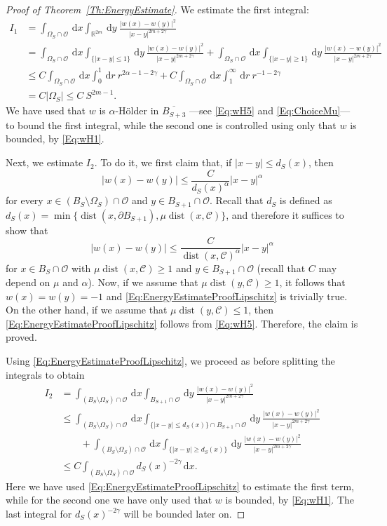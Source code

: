 \documentclass[12pt,reqno]{amsart}
\theoremstyle{definition}
\theoremstyle{remark}
\newcommand{\con}[1]{\mathbb{#1}}
\newcommand{\R}{\con{R}} %
\newcommand{\ccal}{\mathscr{C}}
\newcommand{\ocal}{\mathcal{O}}
\newcommand{\s}{\gamma}
\renewcommand{\d}{\,\mathrm{d}} %
\DeclareMathOperator{\dist}{dist}
\numberwithin{equation}{section}
\begin{document}
\begin{proof}[Proof of Theorem~\ref{Th:EnergyEstimate}]
	We estimate the first integral:
	\begin{align*}
	I_1 &= \int_{\Omega_{S}\cap \ocal} \d x \int_{\R^{2m}} \d y \  \frac{|w(x)-w(y)|^2}{|x-y|^{2m+2\s}} \\
	&= \int_{\Omega_{S}\cap \ocal} \d x \int_{\{|x-y|\leq 1\}} \d y \ \frac{|w(x)-w(y)|^2}{|x-y|^{2m+2\s}} + \int_{\Omega_{S}\cap \ocal} \d x \int_{\{|x-y|\geq 1\}} \d y \ \frac{|w(x)-w(y)|^2}{|x-y|^{2m+2\s}} \\
	&\leq C \int_{\Omega_{S}\cap \ocal} \d x \int_0^1 \d r \ r^{2\alpha-1-2\s} + C \int_{\Omega_{S}\cap \ocal} \d x \int_1^\infty \d r \ r^{-1-2\s} \\
	&= C |\Omega_S| \leq C \ S^{2m-1}.
	\end{align*}
	We have used that $w$ is $\alpha$-Hölder in $\overline{B_{S+3}}$ ---see \eqref{Eq:wH5} and \eqref{Eq:ChoiceMu}--- to bound the first integral, while the second one is controlled using only that $w$ is bounded, by \eqref{Eq:wH1}. 
	
	Next, we estimate $I_2$. To do it, we first claim that, if $|x-y|\leq d_S(x)$, then
	\begin{equation}
	\label{Eq:EnergyEstimateProofLipschitz}
	|w(x)-w(y)| \leq \dfrac{C}{d_S(x)^\alpha} |x-y|^\alpha	
	\end{equation}
	for every $x\in (B_S\setminus \Omega_S)\cap \ocal$ and $y \in B_{S+1}\cap \ocal$. Recall that $d_S$ is defined as $d_S(x)=\min \{\dist(x,\partial B_{S+1}) , \mu \dist (x, \ccal)\}$, and therefore it suffices to show that
	$$
	|w(x)-w(y)| \leq \dfrac{C}{\dist (x, \ccal)^\alpha} |x-y|^\alpha
	$$
	for $x\in B_S \cap \ocal$ with $\mu \dist (x, \ccal) \geq 1$ and $y \in B_{S+1}\cap \ocal$ (recall that $C$ may depend on $\mu$ and $\alpha$). Now, if we assume that $\mu \dist (y, \ccal) \geq 1$, it follows that $w(x)=w(y)=-1$ and \eqref{Eq:EnergyEstimateProofLipschitz} is trivially true. On the other hand, if we assume that $\mu \dist (y, \ccal) \leq 1$, then \eqref{Eq:EnergyEstimateProofLipschitz} follows from \eqref{Eq:wH5}. Therefore, the claim is proved.
	
	Using \eqref{Eq:EnergyEstimateProofLipschitz}, we proceed as before splitting the integrals to obtain
	\begin{align*}
	I_2 &= \int_{(B_S\setminus \Omega_S)\cap \ocal} \d x \int_{B_{S+1}\cap \ocal} \d y \  \frac{|w(x)-w(y)|^2}{|x-y|^{2m+2\s}}   \\
	&\leq \int_{(B_S\setminus \Omega_S)\cap \ocal} \d x \int_{ \{|x-y|\leq d_S(x)\} \cap B_{S+1}\cap \ocal} \d y \  \frac{|w(x)-w(y)|^2}{|x-y|^{2m+2\s}} \\
	& \quad \quad + \int_{(B_S\setminus \Omega_S)\cap \ocal} \d x \int_{\{|x-y|\geq d_S(x)\}} \d y \ \frac{|w(x)-w(y)|^2}{|x-y|^{2m+2\s}} \\
	&\leq C \int_{(B_S\setminus \Omega_S)\cap \ocal} d_S(x)^{-2\s} \d x .
	\end{align*}
	Here we have used \eqref{Eq:EnergyEstimateProofLipschitz} to estimate the first term, while for the second one we have only used that $w$ is bounded, by \eqref{Eq:wH1}. The last integral for $d_S(x)^{-2\s}$ will be bounded later on.
	

\end{proof}
\end{document}
